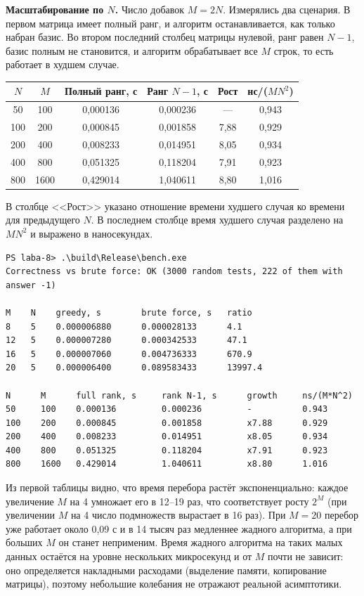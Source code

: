 \textbf{Масштабирование по $N$.} Число добавок $M = 2N$. Измерялись два сценария. В
первом матрица имеет полный ранг, и алгоритм останавливается, как только набран базис.
Во втором последний столбец матрицы нулевой, ранг равен $N - 1$, базис полным не становится,
и алгоритм обрабатывает все $M$ строк, то есть работает в худшем случае.

\begin{table}[h]
\centering
\begin{tabular}{|c|c|c|c|c|c|}
\hline
$N$ & $M$ & Полный ранг, с & Ранг $N-1$, с & Рост & нс/($MN^2$) \\
\hline
50  & 100  & 0{,}000136 & 0{,}000236 & ---  & 0{,}943 \\
100 & 200  & 0{,}000845 & 0{,}001858 & 7{,}88 & 0{,}929 \\
200 & 400  & 0{,}008233 & 0{,}014951 & 8{,}05 & 0{,}934 \\
400 & 800  & 0{,}051325 & 0{,}118204 & 7{,}91 & 0{,}923 \\
800 & 1600 & 0{,}429014 & 1{,}040611 & 8{,}80 & 1{,}016 \\
\hline
\end{tabular}
\end{table}

В столбце <<Рост>> указано отношение времени худшего случая ко времени для предыдущего $N$.
В последнем столбце время худшего случая разделено на $MN^2$ и выражено в наносекундах.

\begin{verbatim}
PS laba-8> .\build\Release\bench.exe
Correctness vs brute force: OK (3000 random tests, 222 of them with answer -1)

M    N    greedy, s        brute force, s   ratio
8    5    0.000006880      0.000028133      4.1
12   5    0.000007280      0.000342533      47.1
16   5    0.000007060      0.004736333      670.9
20   5    0.000006400      0.089583433      13997.4

N      M      full rank, s     rank N-1, s      growth     ns/(M*N^2)
50     100    0.000136         0.000236         -          0.943
100    200    0.000845         0.001858         x7.88      0.929
200    400    0.008233         0.014951         x8.05      0.934
400    800    0.051325         0.118204         x7.91      0.923
800    1600   0.429014         1.040611         x8.80      1.016
\end{verbatim}

Из первой таблицы видно, что время перебора растёт экспоненциально: каждое увеличение
$M$ на 4 умножает его в 12--19 раз, что соответствует росту $2^M$ (при увеличении $M$ на
4 число подмножеств вырастает в 16 раз). При $M = 20$ перебор уже работает около 0{,}09 с и
в 14 тысяч раз медленнее жадного алгоритма, а при больших $M$ он станет неприменим. Время жадного
алгоритма на таких малых данных остаётся на уровне нескольких микросекунд и от $M$ почти не
зависит: оно определяется накладными расходами (выделение памяти, копирование матрицы), поэтому
небольшие колебания не отражают реальной асимптотики.

